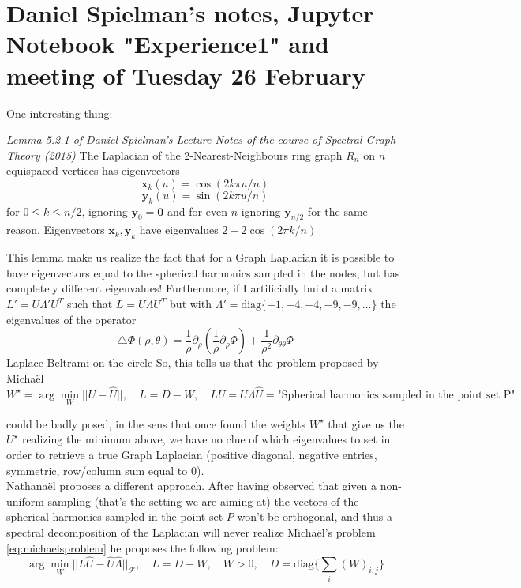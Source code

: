 \section{Daniel Spielman's notes, Jupyter Notebook "Experience1" and meeting of Tuesday 26 February}

One interesting thing:

\begin{theorem}{\textit{Lemma 5.2.1 of Daniel Spielman's Lecture Notes of the course of Spectral Graph Theory (2015)}}
	The Laplacian of the 2-Nearest-Neighbours ring graph $R_n$ on $n$ equispaced vertices has eigenvectors
	$$\mathbf x_k(u) = \cos(2k\pi u/n)$$
	$$\mathbf y_k(u) = \sin(2k\pi u/n)$$
	for $0\leq k\leq n/2$, ignoring $\mathbf y_0 = \mathbf 0$ and for even $n$ ignoring $\mathbf y_{n/2}$ for the same reason. Eigenvectors $\mathbf x_k, \mathbf y_k$ have eigenvalues $2-2\cos(2\pi k/n)$
\end{theorem}

This lemma make us realize the fact that for a Graph Laplacian it is possible to have eigenvectors equal to the spherical harmonics sampled in the nodes, but has completely different eigenvalues! Furthermore, if I artificially build a matrix $L'=U\Lambda'U^T$ such that $L=U\Lambda U^T$ but with $\Lambda'=\text{diag}\{-1, -4, -4, -9, -9, ...\}$ the eigenvalues of the operator  
$$\triangle \Phi(\rho, \theta) = \frac{1}{\rho}\partial_\rho \left(\frac{1}{\rho}\partial_\rho \Phi\right) + \frac{1}{\rho^2}\partial_{\theta\theta}\Phi$$ 
Laplace-Beltrami on the circle  So, this tells us that the problem proposed by Micha\"el
\begin{equation}\label{eq:michaelsproblem}
	W^\star = \arg\min_W||U-\hat U||, \quad L=D-W,\quad LU=U\Lambda
	 \hat U = \text{"Spherical harmonics sampled in the point set P"}
\end{equation}

could be badly posed, in the sens that once found the weights $W^\star$ that give us the $U^\star$ realizing the minimum above, we have no clue of which eigenvalues to set in order to retrieve a true Graph Laplacian (positive diagonal, negative entries, symmetric, row/column sum equal to $0$).\\
Nathana\"el proposes a different approach. After having observed that given a non-uniform sampling (that's the setting we are aiming at) the vectors of the spherical harmonics sampled in the point set $P$ won't be orthogonal, and thus a spectral decomposition of the Laplacian will never realize Micha\"el's problem \ref{eq:michaelsproblem} he proposes the following problem:
\begin{equation}\label{eq:nathanaelsproblem}
	\arg\min_W||L\hat U-\hat U\hat \Lambda||_\mathcal F,\quad L=D-W,\quad  W>0,\quad D=\text{diag}\{\sum_{i}(W)_{i,j}\}
\end{equation}

